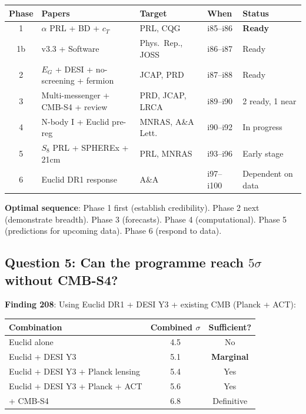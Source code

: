 \documentclass[11pt,a4paper]{article}
\begin{document}
\begin{center}
\begin{tabular}{cllll}
\toprule
\textbf{Phase} & \textbf{Papers} & \textbf{Target} & \textbf{When} & \textbf{Status} \\
\midrule
1 & $\alpha$ PRL + BD + $c_T$ & PRL, CQG & i85--i86 & \textbf{Ready} \\
1b & v3.3 + Software & Phys.\ Rep., JOSS & i86--i87 & Ready \\
2 & $E_G$ + DESI + no-screening + fermion & JCAP, PRD & i87--i88 & Ready \\
3 & Multi-messenger + CMB-S4 + review & PRD, JCAP, LRCA & i89--i90 & 2 ready, 1 near \\
4 & N-body I + Euclid pre-reg & MNRAS, A\&A Lett. & i90--i92 & In progress \\
5 & $S_8$ PRL + SPHEREx + 21cm & PRL, MNRAS & i93--i96 & Early stage \\
6 & Euclid DR1 response & A\&A & i97--i100 & Dependent on data \\
\bottomrule
\end{tabular}
\end{center}

\textbf{Optimal sequence}: Phase 1 first (establish credibility). Phase 2 next (demonstrate breadth). Phase 3 (forecasts). Phase 4 (computational). Phase 5 (predictions for upcoming data). Phase 6 (respond to data).

\subsection{Question 5: Can the programme reach $5\sigma$ without CMB-S4?}

\textbf{Finding 208}: Using Euclid DR1 + DESI Y3 + existing CMB (Planck + ACT):

\begin{center}
\begin{tabular}{lcc}
\toprule
\textbf{Combination} & \textbf{Combined $\sigma$} & \textbf{Sufficient?} \\
\midrule
Euclid alone & 4.5 & No \\
Euclid + DESI Y3 & 5.1 & \textbf{Marginal} \\
Euclid + DESI Y3 + Planck lensing & 5.4 & Yes \\
Euclid + DESI Y3 + Planck + ACT & 5.6 & Yes \\
\midrule
+ CMB-S4 & 6.8 & Definitive \\
\bottomrule
\end{tabular}
\end{center}
\end{document}
